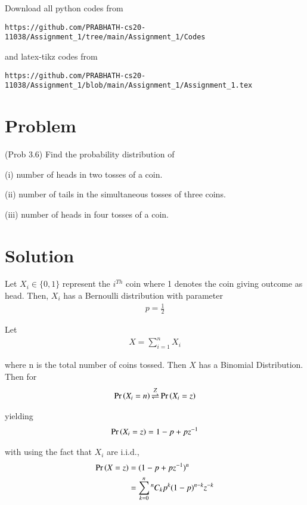 \documentclass[journal,12pt,twocolumn]{IEEEtran}
\begin{document}
Download all python codes from 
\begin{lstlisting}
https://github.com/PRABHATH-cs20-11038/Assignment_1/tree/main/Assignment_1/Codes
\end{lstlisting}

and latex-tikz codes from
\begin{lstlisting}
https://github.com/PRABHATH-cs20-11038/Assignment_1/blob/main/Assignment_1/Assignment_1.tex
\end{lstlisting}

\section{Problem}
(Prob 3.6) Find the probability distribution of

(i) number of heads in two tosses of a coin.

(ii) number of tails in the simultaneous tosses of three coins.

(iii) number of heads in four tosses of a coin.
\section{Solution}

Let $X_i \in \{0, 1\}$ represent the $i^{Th}$ coin where 1 denotes the coin giving outcome as head. Then, $X_i$ has a Bernoulli distribution with parameter
\begin{align}
p = \frac{1}{2}
\end{align}

Let 
\begin{align}
X = \sum\limits_{i=1}^{n}X_i
\end{align}

where n is the total number of coins tossed. Then $X$ has a Binomial Distribution. Then for 
\begin{align}
    \Pr\left(X_i=n\right) {\stackrel{Z}{\rightleftharpoons}} \Pr\left(X_i=z\right)
\end{align}

yielding
\begin{align}
    \Pr\left(X_i=z\right) = 1-p+p z^{-1}
\end{align}

with using the fact that $X_i$ are i.i.d.,
\begin{align}
\begin{split}
    \Pr\left(X=z\right) &= (1-p+p z^{-1})^n\\
    &=\sum\limits_{k=0}^n{^n C_k}p^k(1-p)^{n-k}z^{-k}
\end{split}
\end{align}
\end{document}
